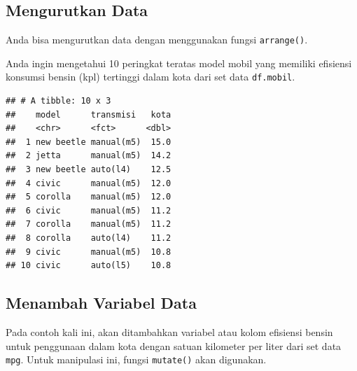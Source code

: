 \documentclass[openany]{book}
\newenvironment{Shaded}{\begin{snugshade}}{\end{snugshade}}
\newcommand{\KeywordTok}[1]{\textcolor[rgb]{0.13,0.29,0.53}{\textbf{#1}}}
\newcommand{\DecValTok}[1]{\textcolor[rgb]{0.00,0.00,0.81}{#1}}
\newcommand{\StringTok}[1]{\textcolor[rgb]{0.31,0.60,0.02}{#1}}
\newcommand{\CommentTok}[1]{\textcolor[rgb]{0.56,0.35,0.01}{\textit{#1}}}
\newcommand{\OperatorTok}[1]{\textcolor[rgb]{0.81,0.36,0.00}{\textbf{#1}}}
\newcommand{\NormalTok}[1]{#1}
\begin{document}
\subsection{Mengurutkan Data}\label{mengurutkan-data}

Anda bisa mengurutkan data dengan menggunakan fungsi \texttt{arrange()}.

Anda ingin mengetahui 10 peringkat teratas model mobil yang memiliki
efisiensi konsumsi bensin (kpl) tertinggi dalam kota dari set data
\texttt{df.mobil}.

\begin{Shaded}
\end{Shaded}

\begin{verbatim}
## # A tibble: 10 x 3
##    model      transmisi   kota
##    <chr>      <fct>      <dbl>
##  1 new beetle manual(m5)  15.0
##  2 jetta      manual(m5)  14.2
##  3 new beetle auto(l4)    12.5
##  4 civic      manual(m5)  12.0
##  5 corolla    manual(m5)  12.0
##  6 civic      manual(m5)  11.2
##  7 corolla    manual(m5)  11.2
##  8 corolla    auto(l4)    11.2
##  9 civic      manual(m5)  10.8
## 10 civic      auto(l5)    10.8
\end{verbatim}

\subsection{Menambah Variabel Data}\label{menambah-variabel-data}

Pada contoh kali ini, akan ditambahkan variabel atau kolom efisiensi
bensin untuk penggunaan dalam kota dengan satuan kilometer per liter
dari set data \texttt{mpg}. Untuk manipulasi ini, fungsi
\texttt{mutate()} akan digunakan.
\end{document}
